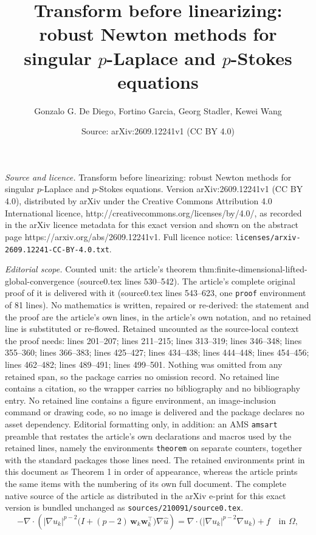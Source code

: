 \documentclass[10pt,a4paper]{amsart}
\title{Transform before linearizing: robust Newton methods for singular $p$-Laplace and $p$-Stokes equations}
\author{Gonzalo G. De Diego, Fortino Garcia, Georg Stadler, Kewei Wang}
\date{Source: arXiv:2609.12241v1 (CC BY 4.0)}
\newcommand{\bs}[1]{\ensuremath{\boldsymbol{#1}}}
\begin{document}
\maketitle

\noindent\emph{Source and licence.} Transform before linearizing: robust Newton methods for singular $p$-Laplace and $p$-Stokes equations. Version arXiv:2609.12241v1 (CC BY 4.0), distributed by arXiv under the Creative Commons Attribution 4.0 International licence, http://creativecommons.org/licenses/by/4.0/, as recorded in the arXiv licence metadata for this exact version and shown on the abstract page https://arxiv.org/abs/2609.12241v1. Full licence notice: \texttt{licenses/arxiv-2609.12241-CC-BY-4.0.txt}.\par\smallskip

\noindent\textit{Editorial scope.} Counted unit: the article's theorem thm:finite-dimensional-lifted-global-convergence (source0.tex lines 530--542). The article's complete original proof of it is delivered with it (source0.tex lines 543--623, one \texttt{proof} environment of 81 lines). No mathematics is written, repaired or re-derived: the statement and the proof are the article's own lines, in the article's own notation, and no retained line is substituted or re-flowed.  Retained uncounted as the source-local context the proof needs: lines 201--207; lines 211--215; lines 313--319; lines 346--348; lines 355--360; lines 366--383; lines 425--427; lines 434--438; lines 444--448; lines 454--456; lines 462--482; lines 489--491; lines 499--501.  Nothing was omitted from any retained span, so the package carries no omission record.  No retained line contains a citation, so the wrapper carries no bibliography and no bibliography entry.  No retained line contains a figure environment, an image-inclusion command or drawing code, so no image is delivered and the package declares no asset dependency.  Editorial formatting only, in addition: an AMS \texttt{amsart} preamble that restates the article's own declarations and macros used by the retained lines, namely the environments \texttt{theorem} on separate counters, together with the standard packages those lines need.  The retained environments print in this document as Theorem 1 in order of appearance, whereas the article prints the same items with the numbering of its own full document.  The complete native source of the article as distributed in the arXiv e-print for this exact version is bundled unchanged as \texttt{sources/210091/source0.tex}.
\begin{equation}
\label{eq:newton-intro}
-\nabla\cdot\left(|\nabla u_k|^{p-2}
\bigl(I + (p-2)\,\bs{w}_k\bs{w}_k^\top\bigr)\nabla\hat u\right)
= \nabla\cdot\bigl(|\nabla u_k|^{p-2}\nabla u_k\bigr) + f
\quad\text{in }\Omega,
\end{equation}
\end{document}
